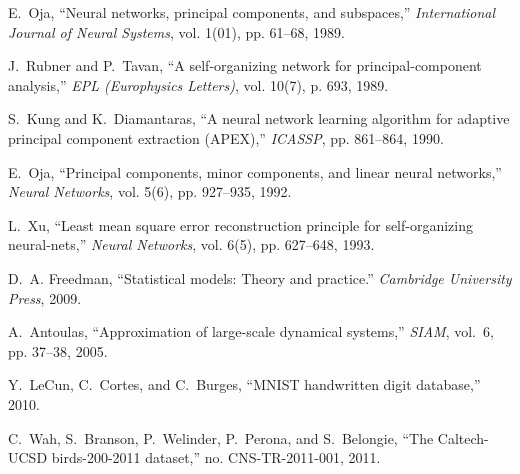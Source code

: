 \documentclass[journal]{IEEEtran}
\begin{document}
\begin{thebibliography}{10}
E.~Oja, ``Neural networks, principal components, and subspaces,''
  \emph{International Journal of Neural Systems}, vol. 1(01), pp. 61--68, 1989.

J.~Rubner and P.~Tavan, ``A self-organizing network for principal-component
  analysis,'' \emph{EPL (Europhysics Letters)}, vol. 10(7), p. 693, 1989.

S.~Kung and K.~Diamantaras, ``A neural network learning algorithm for adaptive
  principal component extraction ({APEX}),'' \emph{ICASSP}, pp. 861--864, 1990.

E.~Oja, ``Principal components, minor components, and linear neural networks,''
  \emph{Neural Networks}, vol. 5(6), pp. 927--935, 1992.

L.~Xu, ``Least mean square error reconstruction principle for self-organizing
  neural-nets,'' \emph{Neural Networks}, vol. 6(5), pp. 627--648, 1993.

D.~A. Freedman, ``Statistical models: Theory and practice.'' \emph{Cambridge
  University Press}, 2009.

A.~Antoulas, ``Approximation of large-scale dynamical systems,'' \emph{SIAM},
  vol.~6, pp. 37--38, 2005.

Y.~LeCun, C.~Cortes, and C.~Burges, ``{MNIST} handwritten digit database,''
  2010.

C.~Wah, S.~Branson, P.~Welinder, P.~Perona, and S.~Belongie, ``The
  {Caltech}-{UCSD} birds-200-2011 dataset,'' no. CNS-TR-2011-001, 2011.

\end{thebibliography}


%

% 

\end{document}
